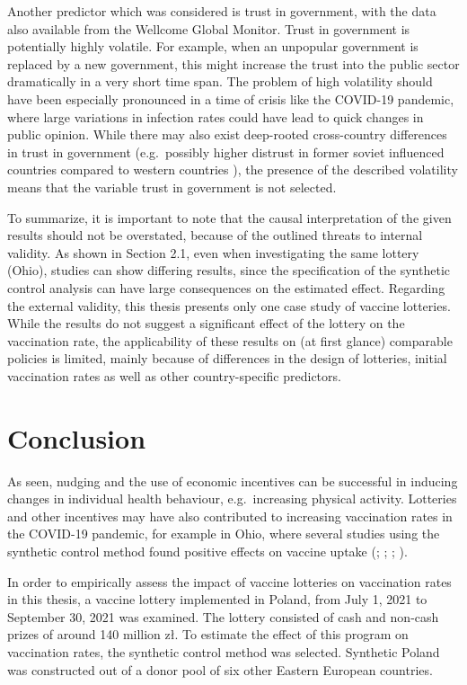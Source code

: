 \documentclass{scrbook}
\begin{document}
Another predictor which was considered is trust in government, with the
data also available from the Wellcome Global Monitor. Trust in
government is potentially highly volatile. For example, when an
unpopular government is replaced by a new government, this might
increase the trust into the public sector dramatically in a very short
time span. The problem of high volatility should have been especially
pronounced in a time of crisis like the COVID-19 pandemic, where large
variations in infection rates could have lead to quick changes in public
opinion. While there may also exist deep-rooted cross-country
differences in trust in government (e.g.~possibly higher distrust in
former soviet influenced countries compared to western countries
\parencite{costa-font_institutional_2021}), the presence of the
described volatility means that the variable trust in government is not
selected.

To summarize, it is important to note that the causal interpretation of
the given results should not be overstated, because of the outlined
threats to internal validity. As shown in Section 2.1, even when
investigating the same lottery (Ohio), studies can show differing
results, since the specification of the synthetic control analysis can
have large consequences on the estimated effect. Regarding the external
validity, this thesis presents only one case study of vaccine lotteries.
While the results do not suggest a significant effect of the lottery on
the vaccination rate, the applicability of these results on (at first
glance) comparable policies is limited, mainly because of differences in
the design of lotteries, initial vaccination rates as well as other
country-specific predictors.

\chapter{Conclusion}

As seen, nudging and the use of economic incentives can be successful in
inducing changes in individual health behaviour, e.g.~increasing
physical activity. Lotteries and other incentives may have also
contributed to increasing vaccination rates in the COVID-19 pandemic,
for example in Ohio, where several studies using the synthetic control
method found positive effects on vaccine uptake
(\cite{mallow_covid-19_2022}; \cite{brehm_ohio_2022};
\cite{barber_conditional_2022}; \cite{sehgal_impact_2021}).

In order to empirically assess the impact of vaccine lotteries on
vaccination rates in this thesis, a vaccine lottery implemented in
Poland, from July 1, 2021 to September 30, 2021 was examined. The
lottery consisted of cash and non-cash prizes of around 140 million zł.
To estimate the effect of this program on vaccination rates, the
synthetic control method was selected. Synthetic Poland was constructed
out of a donor pool of six other Eastern European countries.
\end{document}
